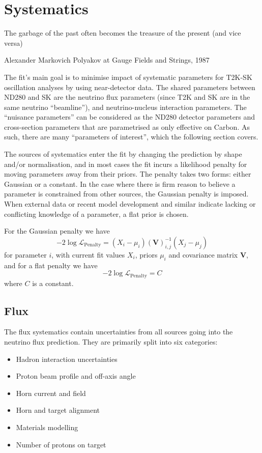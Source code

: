 \section{Systematics}
\label{sec:syst}

\epigraph{The garbage of the past often becomes the treasure of the present (and vice versa)}{Alexander Markovich Polyakov at Gauge Fields and Strings, 1987}

The fit's main goal is to minimise impact of systematic parameters for T2K-SK oscillation analyses by using near-detector data. The shared parameters between ND280 and SK are the neutrino flux parameters (since T2K and SK are in the same neutrino ``beamline''), and neutrino-nucleus interaction parameters. The ``nuisance parameters'' can be considered as the ND280 detector parameters and cross-section parameters that are parametrised as only effective on Carbon. As such, there are many ``parameters of interest'', which the following section covers.

The sources of systematics enter the fit by changing the prediction by shape and/or normalisation, and in most cases the fit incurs a likelihood penalty for moving parameters away from their priors. The penalty takes two forms: either Gaussian or a constant. In the case where there is firm reason to believe a parameter is constrained from other sources, the Gaussian penalty is imposed. When external data or recent model development and similar indicate lacking or conflicting knowledge of a parameter, a flat prior is chosen.

For the Gaussian penalty we have
\begin{equation}
	-2\log\mathcal{L}_\text{Penalty} = (X_i-\mu_i) \left(\mathbf{V}\right)^{-1}_{i,j} (X_j-\mu_j)
\end{equation}
for parameter $i$, with current fit values $X_i$, priors $\mu_i$ and covariance matrix $\mathbf{V}$, and for a flat penalty we have
\begin{equation}
	-2\log\mathcal{L}_\text{Penalty} = C
\end{equation}
where $C$ is a constant.

\subsection{Flux}
\label{subsec:syst_flux}
The flux systematics contain uncertainties from all sources going into the neutrino flux prediction. They are primarily split into six categories:
\begin{itemize}
	\item Hadron interaction uncertainties
	\item Proton beam profile and off-axis angle
	\item Horn current and field
	\item Horn and target alignment
	\item Materials modelling
	\item Number of protons on target
\end{itemize}


